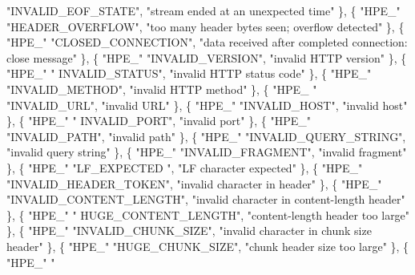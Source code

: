 \begin{DoxyCode}
       \textcolor{stringliteral}{"INVALID\_EOF\_STATE"},  \textcolor{stringliteral}{"stream ended at an unexpected time"}  \},    \{ \textcolor{stringliteral}{"HPE\_"} \textcolor{stringliteral}{"HEADER\_OVERFLOW"},  \textcolor{stringliteral}{"too many
       header bytes seen; overflow detected"}  \},    \{ \textcolor{stringliteral}{"HPE\_"} \textcolor{stringliteral}{"CLOSED\_CONNECTION"},  \textcolor{stringliteral}{"data received after completed
       connection: close message"}  \},    \{ \textcolor{stringliteral}{"HPE\_"} \textcolor{stringliteral}{"INVALID\_VERSION"},  \textcolor{stringliteral}{"invalid HTTP version"}  \},    \{ \textcolor{stringliteral}{"HPE\_"} \textcolor{stringliteral}{"
      INVALID\_STATUS"},  \textcolor{stringliteral}{"invalid HTTP status code"}  \},    \{ \textcolor{stringliteral}{"HPE\_"} \textcolor{stringliteral}{"INVALID\_METHOD"},  \textcolor{stringliteral}{"invalid HTTP method"}  \},    \{ \textcolor{stringliteral}{"HPE\_
      "} \textcolor{stringliteral}{"INVALID\_URL"},  \textcolor{stringliteral}{"invalid URL"}  \},    \{ \textcolor{stringliteral}{"HPE\_"} \textcolor{stringliteral}{"INVALID\_HOST"},  \textcolor{stringliteral}{"invalid host"}  \},    \{ \textcolor{stringliteral}{"HPE\_"} \textcolor{stringliteral}{"
      INVALID\_PORT"},  \textcolor{stringliteral}{"invalid port"}  \},    \{ \textcolor{stringliteral}{"HPE\_"} \textcolor{stringliteral}{"INVALID\_PATH"},  \textcolor{stringliteral}{"invalid path"}  \},    \{ \textcolor{stringliteral}{"HPE\_"} \textcolor{stringliteral}{"INVALID\_QUERY\_STRING"}, 
       \textcolor{stringliteral}{"invalid query string"}  \},    \{ \textcolor{stringliteral}{"HPE\_"} \textcolor{stringliteral}{"INVALID\_FRAGMENT"},  \textcolor{stringliteral}{"invalid fragment"}  \},    \{ \textcolor{stringliteral}{"HPE\_"} \textcolor{stringliteral}{"LF\_EXPECTED
      "},  \textcolor{stringliteral}{"LF character expected"}  \},    \{ \textcolor{stringliteral}{"HPE\_"} \textcolor{stringliteral}{"INVALID\_HEADER\_TOKEN"},  \textcolor{stringliteral}{"invalid character in header"}  \},    \{ \textcolor{stringliteral}{
      "HPE\_"} \textcolor{stringliteral}{"INVALID\_CONTENT\_LENGTH"},  \textcolor{stringliteral}{"invalid character in content-length header"}  \},    \{ \textcolor{stringliteral}{"HPE\_"} \textcolor{stringliteral}{"
      HUGE\_CONTENT\_LENGTH"},  \textcolor{stringliteral}{"content-length header too large"}  \},    \{ \textcolor{stringliteral}{"HPE\_"} \textcolor{stringliteral}{"INVALID\_CHUNK\_SIZE"},  \textcolor{stringliteral}{"invalid character in
       chunk size header"}  \},    \{ \textcolor{stringliteral}{"HPE\_"} \textcolor{stringliteral}{"HUGE\_CHUNK\_SIZE"},  \textcolor{stringliteral}{"chunk header size too large"}  \},    \{ \textcolor{stringliteral}{"HPE\_"} \textcolor{stringliteral}{"
}
\end{DoxyCode}
